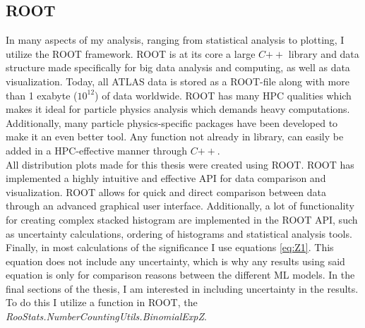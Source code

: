 \subsection{ROOT}
In many aspects of my analysis, ranging from statistical analysis to plotting, I utilize the ROOT framework.
ROOT \cite{ROOT} is at its core a large $C{++}$ library and data structure made specifically for big data
analysis and computing, as well as data visualization. Today, all ATLAS data is stored as a ROOT-file along
with more than 1 exabyte ($10^{12}$) of data worldwide. ROOT has many \ac{HPC} qualities which makes it ideal for particle
physics analysis which demands heavy computations. Additionally, many particle physics-specific packages
have been developed to make it an even better tool. Any function not already in library,
can easily be added in a \ac{HPC}-effective manner through $C{++}$.
\\
All distribution plots made for this thesis were created using ROOT. ROOT has implemented a highly intuitive and
effective \ac{API} for data comparison and visualization. ROOT allows for quick and direct 
comparison between data through an advanced graphical user interface. Additionally, a lot of
functionality for creating complex stacked histogram are implemented in the ROOT \ac{API}, such
as uncertainty calculations, ordering of histograms and statistical analysis tools. 
\\
Finally, in most calculations of the significance I use equations \ref{eq:Z1}. This equation does not include any 
uncertainty, which is why any results using said equation is only for comparison reasons between the different \ac{ML}
models. In the final sections of the thesis, I am interested in including uncertainty in the results. To do this I utilize 
a function in ROOT, the \emph{RooStats.NumberCountingUtils.BinomialExpZ}.
